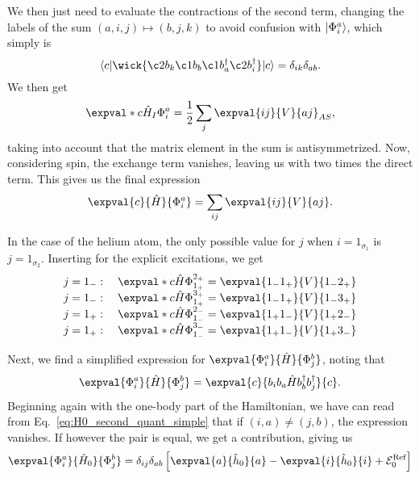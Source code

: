 We then just need to evaluate the contractions of the second term, changing the labels of the sum $(a, i, j) \mapsto (b, j, k)$ to avoid confusion with $\lvert\Phi_i^a\rangle$, which simply is
\begin{equation*}
    \langle c \vert
    \wick{
        \c2 b_k \c1 b_b \c1 b_a^\dagger \c2 b_i^\dagger
    }
    \vert c \rangle
    = \delta_{ik} \delta_{ab}.
\end{equation*}
We then get
\begin{equation}\label{eq:1p1h-ground-twobody}
    \expval*{c}{\hat{H}_I}{\Phi_i^a} = \frac{1}{2} \sum_{j} \expval{i j}{V}{a j}_{AS},
\end{equation}
taking into account that the matrix element in the sum is antisymmetrized.
Now, considering spin, the exchange term vanishes, leaving us with two times the direct term.
This gives us the final expression
\begin{equation}\label{eq:1p1h-ground}
    \expval{c}{\hat{H}}{\Phi_i^a} = \sum_{ij} \expval{ij}{V}{aj}.
\end{equation}

In the case of the helium atom, the only possible value for $j$ when $i = 1_{\sigma_1}$ is $j = 1_{\sigma_2}$.
Inserting for the explicit excitations, we get
\begin{equation}\label{eq:1p1h-ground-list}
    \arraycolsep=1.4pt
    \begin{array}{crcl}
        j = 1_{-}: \quad
        & \expval*{c}{\hat{H}}{\Phi_{1_{+}}^{2_{+}}}\hspace{0.27pt}
        & = &
        \expval{1_{-} 1_{+}}{V}{1_{-} 2_{+}} \\

        j = 1_{-}: \quad
        & \expval*{c}{\hat{H}}{\Phi_{1_{+}}^{3_{+}}}\hspace{0.27pt}
        & = &
        \expval{1_{-} 1_{+}}{V}{1_{-} 3_{+}} \\

        j = 1_{+}: \quad
        & \expval*{c}{\hat{H}}{\Phi_{1_{-}}^{2_{-}}}
        & = &
        \expval{1_{+} 1_{-}}{V}{1_{+} 2_{-}} \\

        j = 1_{+}: \quad
        & \expval*{c}{\hat{H}}{\Phi_{1_{-}}^{3_{-}}}
        & = &
        \expval{1_{+} 1_{-}}{V}{1_{+} 3_{-}}
    \end{array}
\end{equation}

Next, we find a simplified expression for $\expval{\Phi_i^a}{\hat{H}}{\Phi_j^b}$,
noting that
\begin{equation*}
    \expval{\Phi_i^a}{\hat{H}}{\Phi_j^b} = \expval{c}{b_i b_a \hat{H} b_b^\dagger b_j^\dagger}{c}.
\end{equation*}
Beginning again with the one-body part of the Hamiltonian, we have can read from Eq.~\eqref{eq:H0_second_quant_simple} that if $(i, a) \neq (j, b)$, the expression vanishes.
If however the pair is equal, we get a contribution, giving us
\begin{equation*}
    \expval{\Phi_i^a}{\hat{H}_0}{\Phi_j^b} = \delta_{ij} \delta_{ab} \left[ \expval{a}{\hat{h}_0}{a} - \expval{i}{\hat{h}_0}{i} + \mathcal{E}_0^{\text{Ref}} \right]
\end{equation*}

